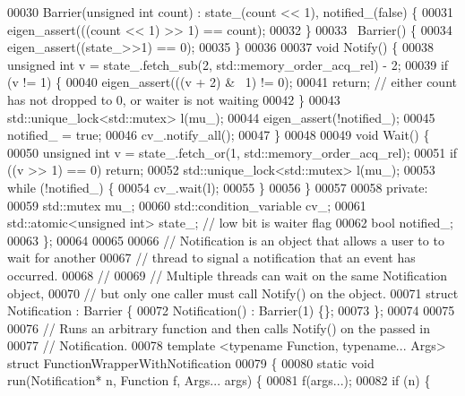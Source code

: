 \begin{DoxyCode}
00030   Barrier(\textcolor{keywordtype}{unsigned} \textcolor{keywordtype}{int} count) : state\_(count << 1), notified\_(false) \{
00031     eigen\_assert(((count << 1) >> 1) == count);
00032   \}
00033   ~Barrier() \{
00034     eigen\_assert((state\_>>1) == 0);
00035   \}
00036 
00037   \textcolor{keywordtype}{void} Notify() \{
00038     \textcolor{keywordtype}{unsigned} \textcolor{keywordtype}{int} v = state\_.fetch\_sub(2, std::memory\_order\_acq\_rel) - 2;
00039     \textcolor{keywordflow}{if} (v != 1) \{
00040       eigen\_assert(((v + 2) & ~1) != 0);
00041       \textcolor{keywordflow}{return};  \textcolor{comment}{// either count has not dropped to 0, or waiter is not waiting}
00042     \}
00043     std::unique\_lock<std::mutex> l(mu\_);
00044     eigen\_assert(!notified\_);
00045     notified\_ = \textcolor{keyword}{true};
00046     cv\_.notify\_all();
00047   \}
00048 
00049   \textcolor{keywordtype}{void} Wait() \{
00050     \textcolor{keywordtype}{unsigned} \textcolor{keywordtype}{int} v = state\_.fetch\_or(1, std::memory\_order\_acq\_rel);
00051     \textcolor{keywordflow}{if} ((v >> 1) == 0) \textcolor{keywordflow}{return};
00052     std::unique\_lock<std::mutex> l(mu\_);
00053     \textcolor{keywordflow}{while} (!notified\_) \{
00054       cv\_.wait(l);
00055     \}
00056   \}
00057 
00058  \textcolor{keyword}{private}:
00059   std::mutex mu\_;
00060   std::condition\_variable cv\_;
00061   std::atomic<unsigned int> state\_;  \textcolor{comment}{// low bit is waiter flag}
00062   \textcolor{keywordtype}{bool} notified\_;
00063 \};
00064 
00065 
00066 \textcolor{comment}{// Notification is an object that allows a user to to wait for another}
00067 \textcolor{comment}{// thread to signal a notification that an event has occurred.}
00068 \textcolor{comment}{//}
00069 \textcolor{comment}{// Multiple threads can wait on the same Notification object,}
00070 \textcolor{comment}{// but only one caller must call Notify() on the object.}
00071 \textcolor{keyword}{struct }Notification : Barrier \{
00072   Notification() : Barrier(1) \{\};
00073 \};
00074 
00075 
00076 \textcolor{comment}{// Runs an arbitrary function and then calls Notify() on the passed in}
00077 \textcolor{comment}{// Notification.}
00078 \textcolor{keyword}{template} <\textcolor{keyword}{typename} Function, \textcolor{keyword}{typename}... Args> \textcolor{keyword}{struct }FunctionWrapperWithNotification
00079 \{
00080   \textcolor{keyword}{static} \textcolor{keywordtype}{void} run(Notification* n, Function f, Args... args) \{
00081     f(args...);
00082     \textcolor{keywordflow}{if} (n) \{

\end{DoxyCode}
